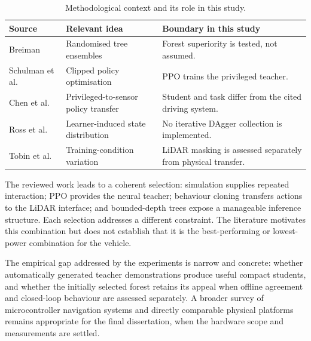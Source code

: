 \begin{table}[htbp]
\centering\small
\caption{Methodological context and its role in this study.}
\label{tab:literature}
\begin{tabularx}{\textwidth}{p{3.1cm}>{\raggedright\arraybackslash}X>{\raggedright\arraybackslash}X}
\toprule
Source & Relevant idea & Boundary in this study \\
\midrule
Breiman~\cite{breiman2001random} & Randomised tree ensembles & Forest superiority is tested, not assumed. \\
Schulman et al.~\cite{schulman2017ppo} & Clipped policy optimisation & PPO trains the privileged teacher. \\
Chen et al.~\cite{chen2019cheating} & Privileged-to-sensor policy transfer & Student and task differ from the cited driving system. \\
Ross et al.~\cite{ross2011reduction} & Learner-induced state distribution & No iterative DAgger collection is implemented. \\
Tobin et al.~\cite{tobin2017domain} & Training-condition variation & LiDAR masking is assessed separately from physical transfer. \\
\bottomrule
\end{tabularx}
\end{table}

The reviewed work leads to a coherent selection: simulation supplies repeated
interaction; PPO provides the neural teacher; behaviour cloning transfers
actions to the LiDAR interface; and bounded-depth trees expose a manageable
inference structure. Each selection addresses a different constraint. The
literature motivates this combination but does not establish that it is the
best-performing or lowest-power combination for the vehicle.

The empirical gap addressed by the experiments is narrow and concrete:
whether automatically generated teacher demonstrations produce useful compact
students, and whether the initially selected forest retains its appeal when
offline agreement and closed-loop behaviour are assessed separately. A broader survey of
microcontroller navigation systems and directly comparable physical platforms
remains appropriate for the final dissertation, when the hardware scope and
measurements are settled.
